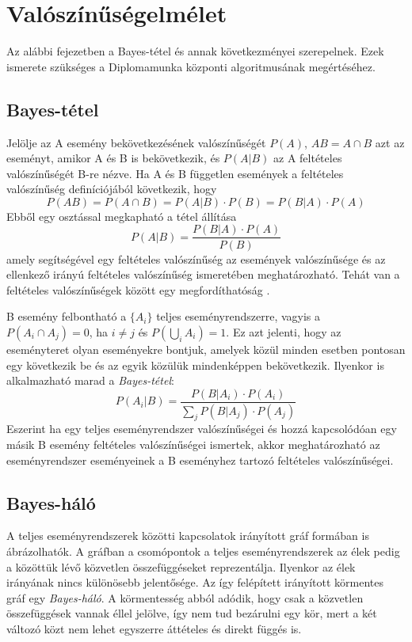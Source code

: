 \chapter{Valószínűségelmélet}

Az alábbi fejezetben a Bayes-tétel és annak következményei szerepelnek. Ezek ismerete szükséges a Diplomamunka központi algoritmusának megértéséhez.

\section{Bayes-tétel}
Jelölje az A esemény bekövetkezésének valószínűségét $P(A)$, $AB = A \cap B$ azt az eseményt, amikor A és B is bekövetkezik, és $P(A|B)$ az A feltételes valószínűségét B-re nézve. Ha A és B független események a feltételes valószínűség definíciójából következik, hogy
$$P(AB) = P(A \cap B) = P(A|B) \cdot P(B) =  P(B|A) \cdot P(A) $$
Ebből egy osztással megkapható a tétel állítása
$$P(A|B) = \frac{P(B|A) \cdot P(A)}{P(B)}$$
amely segítségével egy feltételes valószínűség az események valószínűsége és az ellenkező irányú feltételes valószínűség ismeretében meghatározható. Tehát van a feltételes valószínűségek között egy megfordíthatóság \cite{laszlo2011bayesi}.

B esemény felbontható a $\{A_i\}$ teljes eseményrendszerre, vagyis a $P(A_i \cap A_j) = 0$, ha $i \neq j$ és $ P(\bigcup_{i} A_i) = 1$. Ez azt jelenti, hogy az eseményteret olyan eseményekre bontjuk, amelyek közül minden esetben pontosan egy következik be és az egyik közülük mindenképpen bekövetkezik. Ilyenkor is alkalmazható marad a \emph{Bayes-tétel}:
$$P(A_i|B) = \frac{P(B|A_i) \cdot P(A_i)}{\sum_{j} P(B|A_j) \cdot P(A_j)}$$
Eszerint ha egy teljes eseményrendszer valószínűségei és hozzá kapcsolódóan egy másik B esemény feltételes valószínűségei ismertek, akkor meghatározható az eseményrendszer eseményeinek a B eseményhez tartozó feltételes valószínűségei.

\section{Bayes-háló}
A teljes eseményrendszerek közötti kapcsolatok irányított gráf formában is ábrázolhatók. A gráfban a csomópontok a teljes eseményrendszerek az élek pedig a közöttük lévő közvetlen összefüggéseket reprezentálja. Ilyenkor az élek irányának nincs különösebb jelentősége. Az így felépített irányított körmentes gráf egy \emph{Bayes-háló}. A körmentesség abból adódik, hogy csak a közvetlen összefüggések vannak éllel jelölve, így nem tud bezárulni egy kör, mert a két változó közt nem lehet egyszerre áttételes és direkt függés is.

